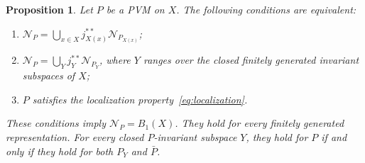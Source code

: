 \documentclass[11pt,leqno]{amsart}
\theoremstyle{compact}
\numberwithin{equation}{section}
\newtheorem{proposition}[theorem]{Proposition}
\theoremstyle{compactremark}
\theoremstyle{compact}
\newcommand{\1}{\mathbbm{1}}
\begin{document}
\begin{proposition}\label{prop:normal-coverage}
Let $P$ be a PVM on $X$. The following conditions are equivalent:
\begin{enumerate}
\item $\mathcal N_P=\bigcup_{x\in X}j_{X(x)}^{**}\mathcal N_{P_{X(x)}}$;
\item $\mathcal N_P=\bigcup_Yj_Y^{**}\mathcal N_{P_Y}$, where $Y$ ranges over the closed finitely generated invariant subspaces of $X$;
\item $P$ satisfies the localization property~\eqref{eq:localization}.
\end{enumerate}
These conditions imply $\mathcal N_P=B_1(X)$. They hold for every finitely generated representation. For every closed $P$-invariant subspace $Y$, they hold for $P$ if and only if they hold for both $P_Y$ and $\bar P$.
\end{proposition}
\end{document}
